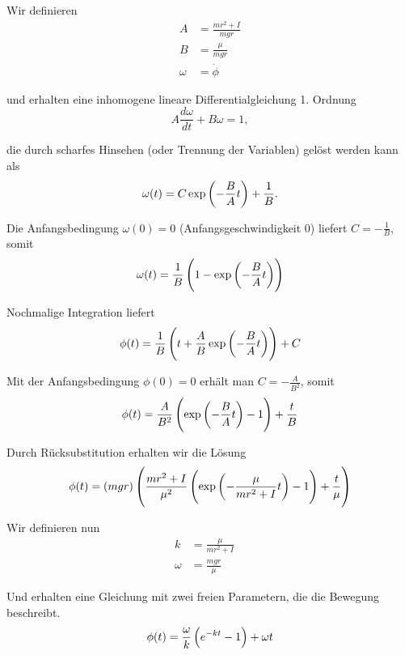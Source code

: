 \documentclass[a4paper,german,12pt,smallheadings]{scrartcl}
\begin{document}
Wir definieren
\begin{align}
  A &= \frac{mr^2+I}{mgr} \\
  B &= \frac{\mu}{mgr} \\
  \omega &= \dot{\phi}
\end{align}

und erhalten eine inhomogene lineare Differentialgleichung 1. Ordnung
\begin{equation}
  A \frac{d \omega}{dt} + B \omega = 1,
\end{equation}

die durch scharfes Hinsehen (oder Trennung der Variablen) gelöst werden kann als
\begin{equation}
  \omega(t) = C \exp\del{- \frac{B}{A} t} + \frac{1}{B}.
\end{equation}

Die Anfangsbedingung $\omega(0) = 0$ (Anfangsgeschwindigkeit 0) liefert $C =
-\frac{1}{B}$, somit
\begin{equation}
  \omega(t) = \frac{1}{B} \del{1 - \exp\del{-\frac{B}{A} t}}
\end{equation}

Nochmalige Integration liefert
\begin{equation}
  \phi(t) = \frac{1}{B} \del{t + \frac{A}{B} \exp\del{-\frac{B}{A} t}} + C
\end{equation}

Mit der Anfangsbedingung $\phi(0) = 0$ erhält man $C = -\frac{A}{B^2}$, somit
\begin{equation}
  \phi(t) = \frac{A}{B^2} \del{ \exp\del{-\frac{B}{A} t} - 1} + \frac{t}{B}
\end{equation}

Durch Rücksubstitution erhalten wir die Lösung
\begin{equation}
  \phi(t)
  = \del{mgr}
  \del{
    \frac{mr^2+I}{\mu^2}
    \del{
      \exp\del{-\frac{\mu}{mr^2 + I} t} - 1
  } + \frac{t}{\mu}}
\end{equation}

Wir definieren nun
\begin{align}
  k &= \frac{\mu}{mr^2 + I} \quad \\
  \omega &= \frac{mgr}{\mu}
\end{align}

Und erhalten eine Gleichung mit zwei freien Parametern, die die Bewegung beschreibt.
\begin{equation}
  \phi(t) = \frac{\omega}{k} \del{e^{-kt} - 1} + \omega t
\end{equation}
\end{document}
